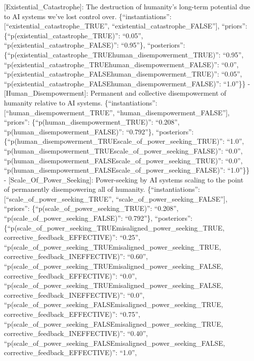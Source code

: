 \documentclass[
  11pt,
  letterpaper,
]{book}
\begin{document}
{[}Existential\_Catastrophe{]}: The destruction of humanity's long-term
potential due to AI systems we've lost control over.
\{``instantiations'': {[}``existential\_catastrophe\_TRUE'',
``existential\_catastrophe\_FALSE''{]}, ``priors'':
\{``p(existential\_catastrophe\_TRUE)'': ``0.05'',
``p(existential\_catastrophe\_FALSE)'': ``0.95''\}, ``posteriors'':
\{``p(existential\_catastrophe\_TRUE\textbar human\_disempowerment\_TRUE)'':
``0.95'',
``p(existential\_catastrophe\_TRUE\textbar human\_disempowerment\_FALSE)'':
``0.0'',
``p(existential\_catastrophe\_FALSE\textbar human\_disempowerment\_TRUE)'':
``0.05'',
``p(existential\_catastrophe\_FALSE\textbar human\_disempowerment\_FALSE)'':
``1.0''\}\} - {[}Human\_Disempowerment{]}: Permanent and collective
disempowerment of humanity relative to AI systems. \{``instantiations'':
{[}``human\_disempowerment\_TRUE'', ``human\_disempowerment\_FALSE''{]},
``priors'': \{``p(human\_disempowerment\_TRUE)'': ``0.208'',
``p(human\_disempowerment\_FALSE)'': ``0.792''\}, ``posteriors'':
\{``p(human\_disempowerment\_TRUE\textbar scale\_of\_power\_seeking\_TRUE)'':
``1.0'',
``p(human\_disempowerment\_TRUE\textbar scale\_of\_power\_seeking\_FALSE)'':
``0.0'',
``p(human\_disempowerment\_FALSE\textbar scale\_of\_power\_seeking\_TRUE)'':
``0.0'',
``p(human\_disempowerment\_FALSE\textbar scale\_of\_power\_seeking\_FALSE)'':
``1.0''\}\} - {[}Scale\_Of\_Power\_Seeking{]}: Power-seeking by AI
systems scaling to the point of permanently disempowering all of
humanity. \{``instantiations'': {[}``scale\_of\_power\_seeking\_TRUE'',
``scale\_of\_power\_seeking\_FALSE''{]}, ``priors'':
\{``p(scale\_of\_power\_seeking\_TRUE)'': ``0.208'',
``p(scale\_of\_power\_seeking\_FALSE)'': ``0.792''\}, ``posteriors'':
\{``p(scale\_of\_power\_seeking\_TRUE\textbar misaligned\_power\_seeking\_TRUE,
corrective\_feedback\_EFFECTIVE)'': ``0.25'',
``p(scale\_of\_power\_seeking\_TRUE\textbar misaligned\_power\_seeking\_TRUE,
corrective\_feedback\_INEFFECTIVE)'': ``0.60'',
``p(scale\_of\_power\_seeking\_TRUE\textbar misaligned\_power\_seeking\_FALSE,
corrective\_feedback\_EFFECTIVE)'': ``0.0'',
``p(scale\_of\_power\_seeking\_TRUE\textbar misaligned\_power\_seeking\_FALSE,
corrective\_feedback\_INEFFECTIVE)'': ``0.0'',
``p(scale\_of\_power\_seeking\_FALSE\textbar misaligned\_power\_seeking\_TRUE,
corrective\_feedback\_EFFECTIVE)'': ``0.75'',
``p(scale\_of\_power\_seeking\_FALSE\textbar misaligned\_power\_seeking\_TRUE,
corrective\_feedback\_INEFFECTIVE)'': ``0.40'',
``p(scale\_of\_power\_seeking\_FALSE\textbar misaligned\_power\_seeking\_FALSE,
corrective\_feedback\_EFFECTIVE)'': ``1.0'',
\end{document}
